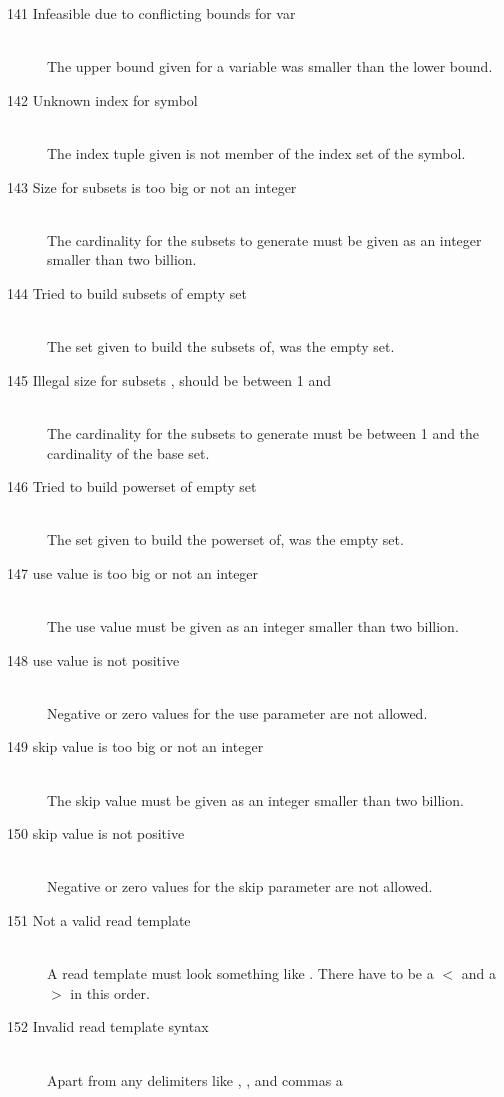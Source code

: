 \begin{description}
\item[141 Infeasible due to conflicting bounds for var ]\ \\
  The upper bound given for a variable was smaller than the lower bound.
\item[142 Unknown index  for symbol ]\ \\
  The index tuple given is not member of the index set of the symbol.
\item[143 Size for subsets  is too big or not an integer]\ \\
  The cardinality for the subsets to generate must be given as an
  integer smaller than two billion.
\item[144 Tried to build subsets of empty set]\ \\
  The set given to build the subsets of, was the empty set.
\item[145 Illegal size for subsets , should be between 1 
  and ]\ \\
  The cardinality for the subsets to generate must be between 1 
  and the cardinality of the base set.
\item[146 Tried to build powerset of empty set ]\ \\
  The set given to build the powerset of, was the empty set.
%
%
\item[147 use value  is too big or not an integer]\ \\
  The use value must be given as an integer smaller than two billion.
\item[148 use value  is not positive]\ \\
  Negative or zero values for the use parameter are not allowed.
\item[149 skip value  is too big or not an integer]\ \\
  The skip value must be given as an integer smaller than two billion.
\item[150 skip value  is not positive]\ \\
  Negative or zero values for the skip parameter are not allowed.
\item[151 Not a valid read template]\ \\
  A read template must look something like .
  There have to be a $<$ and a $>$ in this order.
\item[152 Invalid read template syntax]\ \\
  Apart from any delimiters like \code{$<$}, \code{$>$}, and commas a

\end{description}
